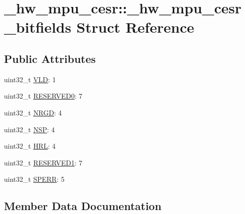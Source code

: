 \hypertarget{struct__hw__mpu__cesr_1_1__hw__mpu__cesr__bitfields}{}\section{\+\_\+hw\+\_\+mpu\+\_\+cesr\+:\+:\+\_\+hw\+\_\+mpu\+\_\+cesr\+\_\+bitfields Struct Reference}
\label{struct__hw__mpu__cesr_1_1__hw__mpu__cesr__bitfields}
\subsection*{Public Attributes}
\begin{DoxyCompactItemize}
\item 
uint32\+\_\+t \hyperlink{struct__hw__mpu__cesr_1_1__hw__mpu__cesr__bitfields_a72414abd5ae919d6ed475c1c650e722e}{V\+LD}\+: 1
\item 
uint32\+\_\+t \hyperlink{struct__hw__mpu__cesr_1_1__hw__mpu__cesr__bitfields_af5a2f24b3de33c1eb587e67ff482ce35}{R\+E\+S\+E\+R\+V\+E\+D0}\+: 7
\item 
uint32\+\_\+t \hyperlink{struct__hw__mpu__cesr_1_1__hw__mpu__cesr__bitfields_a539e63b8d17ad8e9ee40099b15f2ff1c}{N\+R\+GD}\+: 4
\item 
uint32\+\_\+t \hyperlink{struct__hw__mpu__cesr_1_1__hw__mpu__cesr__bitfields_a7975de86e2d03acb7e68ef4e095bdd20}{N\+SP}\+: 4
\item 
uint32\+\_\+t \hyperlink{struct__hw__mpu__cesr_1_1__hw__mpu__cesr__bitfields_a8221a2e6a86e9a88230b93d64dae3bca}{H\+RL}\+: 4
\item 
uint32\+\_\+t \hyperlink{struct__hw__mpu__cesr_1_1__hw__mpu__cesr__bitfields_a9247fdbb9adad79e25b46beb70c3544a}{R\+E\+S\+E\+R\+V\+E\+D1}\+: 7
\item 
uint32\+\_\+t \hyperlink{struct__hw__mpu__cesr_1_1__hw__mpu__cesr__bitfields_aa05884392d1edc736ab9a3d4576ef572}{S\+P\+E\+RR}\+: 5
\end{DoxyCompactItemize}


\subsection{Member Data Documentation}
